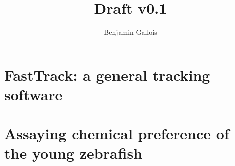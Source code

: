 \documentclass[12pt,a4paper]{report}
\title{Draft v0.1}
\author{Benjamin Gallois}
\begin{document}






\tableofcontents

\part{FastTrack: a general tracking software}


\part{Assaying chemical preference of the young zebrafish}




\end{document}
